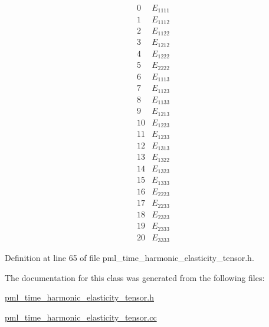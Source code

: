 \[\begin{array}{cc} 0 & E_{1111} \\ 1 & E_{1112} \\ 2 & E_{1122} \\ 3 & E_{1212} \\ 4 & E_{1222} \\ 5 & E_{2222} \\ 6 & E_{1113} \\ 7 & E_{1123} \\ 8 & E_{1133} \\ 9 & E_{1213} \\ 10 & E_{1223} \\ 11 & E_{1233} \\ 12 & E_{1313} \\ 13 & E_{1322} \\ 14 & E_{1323} \\ 15 & E_{1333} \\ 16 & E_{2223} \\ 17 & E_{2233} \\ 18 & E_{2323} \\ 19 & E_{2333} \\ 20 & E_{3333} \end{array}\] 

Definition at line 65 of file pml\+\_\+time\+\_\+harmonic\+\_\+elasticity\+\_\+tensor.\+h.



The documentation for this class was generated from the following files\+:\begin{DoxyCompactItemize}
\item 
\hyperlink{pml__time__harmonic__elasticity__tensor_8h}{pml\+\_\+time\+\_\+harmonic\+\_\+elasticity\+\_\+tensor.\+h}\item 
\hyperlink{pml__time__harmonic__elasticity__tensor_8cc}{pml\+\_\+time\+\_\+harmonic\+\_\+elasticity\+\_\+tensor.\+cc}\end{DoxyCompactItemize}
